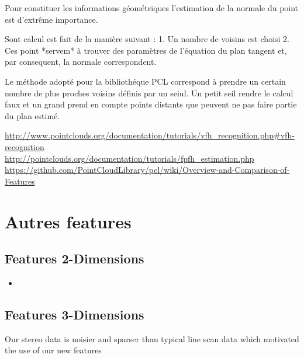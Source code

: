 Pour constituer les informations géométriques l'estimation de la normale du point est d'extrême importance. 

Sont calcul est fait de la manière suivant :
1. Un nombre de voisins est choisi 
2. Ces point *servem* à trouver des paramètres de l'équation du plan tangent et, par consequent, la normale correspondent.

Le méthode adopté pour la bibliothéque PCL correspond à prendre un certain nombre de plus proches voisins définis par un seiul. Un petit seil rendre le calcul faux et un grand prend en compte points distants que peuvent ne pas faire partie du plan estimé.

\url{http://www.pointclouds.org/documentation/tutorials/vfh_recognition.php#vfh-recognition} \\

\url{http://pointclouds.org/documentation/tutorials/fpfh_estimation.php} \\

\url{https://github.com/PointCloudLibrary/pcl/wiki/Overview-and-Comparison-of-Features} \\

\section{Autres features}


\subsection{Features 2-Dimensions}
    \begin{itemize}
         \item 
    \end{itemize}



\subsection{Features 3-Dimensions}
Our stereo data is noisier and sparser than typical line scan data which
motivated the use of our new features

